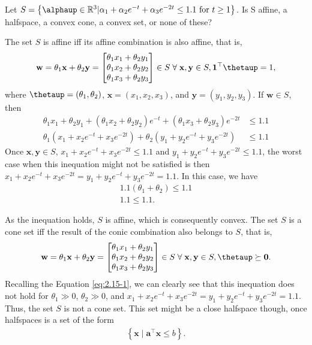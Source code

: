 \documentclass[12pt,a4paper]{article}
\begin{document}

\problem

Let \(S = \left\{\boldsymbol{\alphaup} \in \mathbb{R}^3 | \alpha_1 + \alpha_2e^{-t} + \alpha_3e^{-2t} \leq 1.1\text{ for }t \geq 1\right\}\). Is S affine, a halfspace, a convex cone, a convex set, or none of these?

The set \(S\) is affine iff its affine combination is also affine, that is,
\begin{align}
    \mathbf{w} = \theta_1 \mathbf{x} + \theta_2 \mathbf{y} = \mqty[\theta_1 x_1 + \theta_2 y_1 \\ \theta_1 x_2 + \theta_2 y_2\\ \theta_1 x_3 + \theta_2 y_3] \in S \;\forall\; \mathbf{x}, \mathbf{y} \in S, \mathbf{1}^\top\boldsymbol{\thetaup}=1,
\end{align}
where \(\boldsymbol{\thetaup} = (\theta_1, \theta_2)\), \(\mathbf{x} = (x_1, x_2, x_3)\), and \(\mathbf{y} = (y_1, y_2, y_3)\). If \(\mathbf{w} \in S\), then
\begin{align}
    \label{eq:2.15-1}
    \theta_1 x_1 + \theta_2 y_1 + (\theta_1 x_2 + \theta_2 y_2)e^{-t} + (\theta_1 x_3 + \theta_2 y_3)e^{-2t} & \leq 1.1 \nonumber \\
    \theta_1 \left( x_1 + x_2e^{-t} + x_3e^{-2t} \right) + \theta_2 \left( y_1 + y_2e^{-t} + y_3e^{-2t} \right) & \leq 1.1
\end{align}
Once \(\mathbf{x}, \mathbf{y} \in S\), \(x_1 + x_2e^{-t} + x_3e^{-2t} \leq 1.1\) and \(y_1 + y_2e^{-t} + y_3e^{-2t} \leq 1.1\), the worst case when this inequation might not be satisfied is then \(x_1 + x_2e^{-t} + x_3e^{-2t} = y_1 + y_2e^{-t} + y_3e^{-2t} = 1.1\). In this case, we have
\begin{align}
    1.1(\theta_1 + \theta_2) \leq 1.1\\
    1.1 \leq 1.1.
\end{align}

As the inequation holds, \(S\) is affine, which is consequently convex. The set \(S\) is a cone set iff the result of the conic combination also belongs to \(S\), that is,
\begin{align}
    \mathbf{w} = \theta_1 \mathbf{x} + \theta_2 \mathbf{y} = \mqty[\theta_1 x_1 + \theta_2 y_1 \\ \theta_1 x_2 + \theta_2 y_2\\ \theta_1 x_3 + \theta_2 y_3] \in S \;\forall\; \mathbf{x}, \mathbf{y} \in S, \boldsymbol{\thetaup}\succeq \mathbf{0}.
\end{align}
Recalling the Equation \eqref{eq:2.15-1}, we can clearly see that this inequation does not hold for \(\theta_1 \gg 0\), \(\theta_2 \gg 0\), and \(x_1 + x_2e^{-t} + x_3e^{-2t} = y_1 + y_2e^{-t} + y_3e^{-2t} = 1.1\). Thus, the set \(S\) is not a cone set. This set might be a close halfspace though, once halfspaces is a set of the form
\begin{align}
    \left\{ \mathbf{x} \mid \mathbf{a}^\top \mathbf{x} \leq b \right\}.
\end{align}
\end{document}
